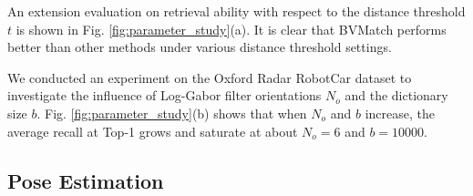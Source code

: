 \documentclass[letterpaper, 10 pt, journal, twoside]{IEEEtran}
\begin{document}
An extension evaluation on retrieval ability with respect to the distance threshold $t$ is shown in Fig. \ref{fig:parameter_study}(a). It is clear that BVMatch performs better than other methods under various distance threshold settings.

We conducted an experiment on the Oxford Radar RobotCar dataset to investigate the influence of Log-Gabor filter orientations $N_o$ and the dictionary size $b$. Fig. \ref{fig:parameter_study}(b) shows that when $N_o$ and $b$ increase, the average recall at Top-1 grows and saturate at about $N_o=6$ and $b=10000$. 






\subsection{Pose Estimation}
\end{document}

